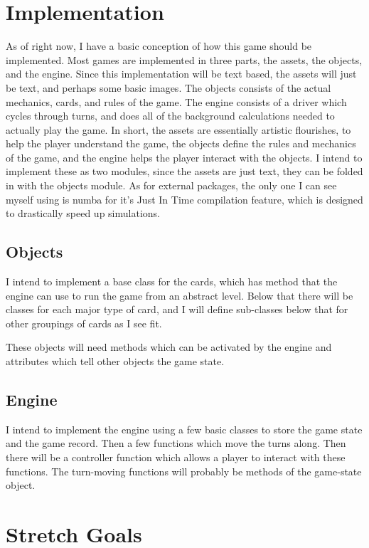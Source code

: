 \documentclass[10pt,letterpaper, twocolumn, science]{revtex4}
\begin{document}
\section{Implementation}

As of right now, I have a basic conception of how this game should be implemented. Most games are implemented in three parts, the assets, the objects, and the engine. Since this implementation will be text based, the assets will just be text, and perhaps some basic images. The objects consists of the actual mechanics, cards, and rules of the game. The engine consists of a driver which cycles through turns, and does all of the background calculations needed to actually play the game. In short, the assets are essentially artistic flourishes, to help the player understand the game, the objects define the rules and mechanics of the game, and the engine helps the player interact with the objects. I intend to implement these as two modules, since the assets are just text, they can be folded in with the objects module. As for external packages, the only one I can see myself using is numba\cite{numba} for it's Just In Time compilation feature, which is designed to drastically speed up simulations.

\subsection{Objects}
I intend to implement a base class for the cards, which has method that the engine can use to run the game from an abstract level. Below that there will be classes for each major type of card, and I will define sub-classes below that for other groupings of cards as I see fit.

These objects will need methods which can be activated by the engine and attributes which tell other objects the game state.


\subsection{Engine}

I intend to implement the engine using a few basic classes to store the game state and the game record. Then a few functions which move the turns along. Then there will be a controller function which allows a player to interact with these functions. The turn-moving functions will probably be methods of the game-state object.

\section{Stretch Goals}
\end{document}
